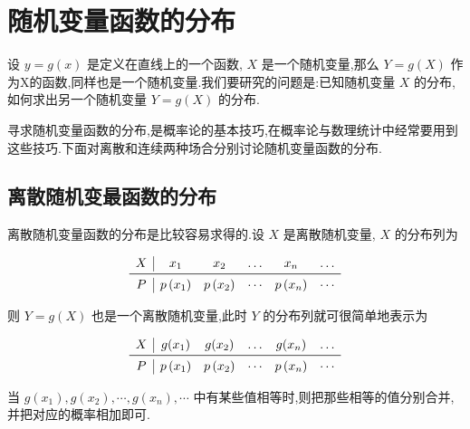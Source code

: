 \section{随机变量函数的分布}\label{sec:2.6}

设 $ y=g(x) $ 是定义在直线上的一个函数, $ X $ 是一个随机变量,那么 $ Y=g(X) $ 作为X的函数,同样也是一个随机变量.我们要研究的问题是:已知随机变量 $ X $ 的分布,如何求出另一个随机变量 $ Y=g(X) $ 的分布.

寻求随机变量函数的分布,是概率论的基本技巧,在概率论与数理统计中经常要用到这些技巧.下面对离散和连续两种场合分别讨论随机变量函数的分布.

\subsection{离散随机变最函数的分布}\label{ssec:2.6.1}

离散随机变量函数的分布是比较容易求得的.设 $ X $ 是离散随机变量, $ X $ 的分布列为

\[
\begin{array}{c|ccccc}
{X} & {x_{1}} & {x_{2}} & {\dots} & {x_{n}} & {\dots} \\ \midrule 
P & {p\left(x_{1}\right)} & {p\left(x_{2}\right)} & {\cdots} & {p\left(x_{n}\right)} & {\cdots}
\end{array}
\]

则 $ Y=g(X) $ 也是一个离散随机变量,此时 $ Y $ 的分布列就可很简单地表示为

\[
\begin{array}{c|ccccc}
{X} & {g(x_{1})} & {g(x_{2})} & {\dots} & {g(x_{n})} & {\dots} \\ \midrule 
P & {p\left(x_{1}\right)} & {p\left(x_{2}\right)} & {\cdots} & {p\left(x_{n}\right)} & {\cdots}
\end{array}
\]

当 $ g\left(x_{1}\right), g\left(x_{2}\right), \cdots, g\left(x_{n}\right), \cdots $ 中有某些值相等时,则把那些相等的值分别合并,并把对应的概率相加即可.

